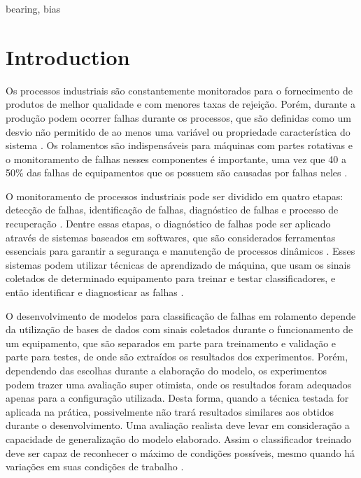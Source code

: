 \documentclass[conference]{IEEEtran}
\begin{document}
\begin{IEEEkeywords}
bearing, bias
\end{IEEEkeywords}

\section{Introduction}
Os processos industriais são constantemente monitorados para o fornecimento de produtos de melhor qualidade e com menores taxas de rejeição.
Porém, durante a produção podem ocorrer falhas durante os processos, que são definidas como um desvio não permitido de ao menos uma variável ou propriedade característica do sistema \cite{b1}.
Os rolamentos são indispensáveis para máquinas com partes rotativas e o monitoramento de falhas nesses componentes é importante, uma vez que 40 a 50\% das falhas de equipamentos que os possuem são causadas por falhas neles \cite{b2}.

O monitoramento de processos industriais pode ser dividido em quatro etapas: detecção de falhas, identificação de falhas, diagnóstico de falhas e processo de recuperação \cite{b3}.
Dentre essas etapas, o diagnóstico de falhas pode ser aplicado através de sistemas baseados em softwares, que são considerados ferramentas essenciais para garantir a segurança e manutenção de processos dinâmicos \cite{b3}.
Esses sistemas podem utilizar técnicas de aprendizado de máquina, que usam os sinais coletados de determinado equipamento para treinar e testar classificadores, e então identificar e diagnosticar as falhas \cite{b4}.

O desenvolvimento de modelos para classificação de falhas em rolamento depende da utilização de bases de dados com sinais coletados durante o funcionamento de um equipamento, que são separados em parte para treinamento e validação e parte para testes, de onde são extraídos os resultados dos experimentos.
Porém, dependendo das escolhas durante a elaboração do modelo, os experimentos podem trazer uma avaliação super otimista, onde os resultados foram adequados apenas para a configuração utilizada.
Desta forma, quando a técnica testada for aplicada na prática, possivelmente não trará resultados similares aos obtidos durante o desenvolvimento.
Uma avaliação realista deve levar em consideração a capacidade de generalização do modelo elaborado.
Assim o classificador treinado deve ser capaz de reconhecer o máximo de condições possíveis, mesmo quando há variações em suas condições de trabalho \cite{b4}.
\end{document}

